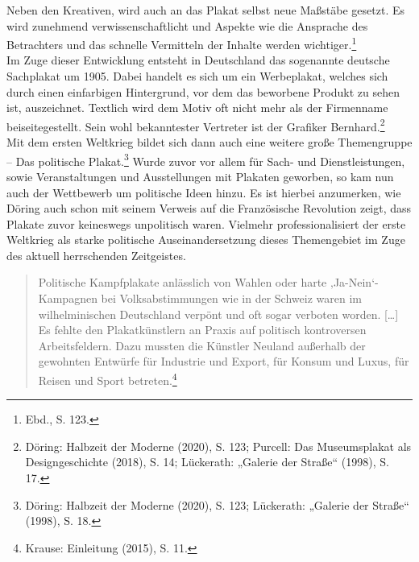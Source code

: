 \documentclass[a4paper,12pt,ngerman]{article}
\begin{document}
Neben den Kreativen, wird auch an das Plakat selbst neue Maßstäbe gesetzt. Es wird zunehmend verwissenschaftlicht und Aspekte wie die Ansprache des Betrachters und das schnelle Vermitteln der Inhalte werden wichtiger.\footnote{Ebd., S. 123.} \\
Im Zuge dieser Entwicklung entsteht in Deutschland das sogenannte deutsche Sachplakat um 1905. Dabei handelt es sich um ein Werbeplakat, welches sich durch einen einfarbigen Hintergrund, vor dem das beworbene Produkt zu sehen ist, auszeichnet. Textlich wird dem Motiv oft nicht mehr als der Firmenname beiseitegestellt. Sein wohl bekanntester Vertreter ist der Grafiker Bernhard.\footnote{Döring: Halbzeit der Moderne (2020), S. 123; Purcell: Das Museumsplakat als Designgeschichte (2018), S. 14; Lückerath: „Galerie der Straße“ (1998), S. 17.} \\
Mit dem ersten Weltkrieg bildet sich dann auch eine weitere große Themengruppe – Das politische Plakat.\footnote{Döring: Halbzeit der Moderne (2020), S. 123; Lückerath: „Galerie der Straße“ (1998), S. 18.}  Wurde zuvor vor allem für Sach- und Dienstleistungen, sowie Veranstaltungen und Ausstellungen mit Plakaten geworben, so kam nun auch der Wettbewerb um politische Ideen hinzu. Es ist hierbei anzumerken, wie Döring auch schon mit seinem Verweis auf die Französische Revolution zeigt, dass Plakate zuvor keineswegs unpolitisch waren. Vielmehr professionalisiert der erste Weltkrieg als starke politische Auseinandersetzung dieses Themengebiet im Zuge des aktuell herrschenden Zeitgeistes.

\blockquote{\fontsize{10pt}{12pt} \selectfont Politische Kampfplakate anlässlich von Wahlen oder harte ‚Ja-Nein‘-Kampagnen bei Volksabstimmungen wie in der Schweiz waren im wilhelminischen Deutschland verpönt und oft sogar verboten worden. […] Es fehlte den Plakatkünstlern an Praxis auf politisch kontroversen Arbeitsfeldern. Dazu mussten die Künstler Neuland außerhalb der gewohnten Entwürfe für Industrie und Export, für Konsum und Luxus, für Reisen und Sport betreten.\footnote{Krause: Einleitung (2015), S. 11.}}
\end{document}
